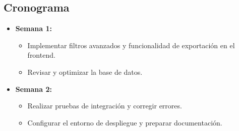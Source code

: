 \subsection{Cronograma}
\begin{itemize}
    \item \textbf{Semana 1:}
    \begin{itemize}
        \item Implementar filtros avanzados y funcionalidad de exportación en el frontend.
        \item Revisar y optimizar la base de datos.
    \end{itemize}
    \item \textbf{Semana 2:}
    \begin{itemize}
        \item Realizar pruebas de integración y corregir errores.
        \item Configurar el entorno de despliegue y preparar documentación.
    \end{itemize}
\end{itemize}